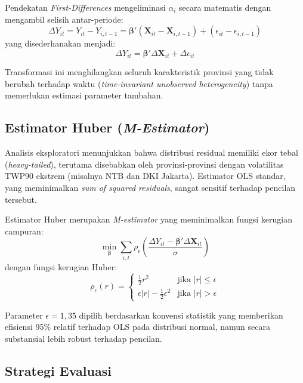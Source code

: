 \documentclass[12pt,a4paper]{article}
\begin{document}
Pendekatan \textit{First-Differences} mengeliminasi $\alpha_i$ secara matematis dengan mengambil selisih antar-periode:
\begin{equation}
\Delta Y_{it} = Y_{it} - Y_{i,t-1} = \boldsymbol{\beta}' (\mathbf{X}_{it} - \mathbf{X}_{i,t-1}) + (\epsilon_{it} - \epsilon_{i,t-1})
\end{equation}
yang disederhanakan menjadi:
\begin{equation}
\Delta Y_{it} = \boldsymbol{\beta}' \Delta \mathbf{X}_{it} + \Delta \epsilon_{it}
\end{equation}

Transformasi ini menghilangkan seluruh karakteristik provinsi yang tidak berubah terhadap waktu (\textit{time-invariant unobserved heterogeneity}) tanpa memerlukan estimasi parameter tambahan.

\subsection{Estimator Huber (\textit{M-Estimator})}

Analisis eksploratori menunjukkan bahwa distribusi residual memiliki ekor tebal (\textit{heavy-tailed}), terutama disebabkan oleh provinsi-provinsi dengan volatilitas TWP90 ekstrem (misalnya NTB dan DKI Jakarta). Estimator OLS standar, yang meminimalkan \textit{sum of squared residuals}, sangat sensitif terhadap pencilan tersebut.

Estimator Huber merupakan \textit{M-estimator} yang meminimalkan fungsi kerugian campuran:
\begin{equation}
\min_{\boldsymbol{\beta}} \sum_{i,t} \rho_\epsilon \left( \frac{\Delta Y_{it} - \boldsymbol{\beta}' \Delta \mathbf{X}_{it}}{\sigma} \right)
\end{equation}
dengan fungsi kerugian Huber:
\begin{equation}
\rho_\epsilon(r) = \begin{cases}
\frac{1}{2} r^2 & \text{jika } |r| \leq \epsilon \\
\epsilon |r| - \frac{1}{2} \epsilon^2 & \text{jika } |r| > \epsilon
\end{cases}
\end{equation}

Parameter $\epsilon = 1{,}35$ dipilih berdasarkan konvensi statistik yang memberikan efisiensi 95\% relatif terhadap OLS pada distribusi normal, namun secara substansial lebih robust terhadap pencilan.

\subsection{Strategi Evaluasi}
\end{document}

